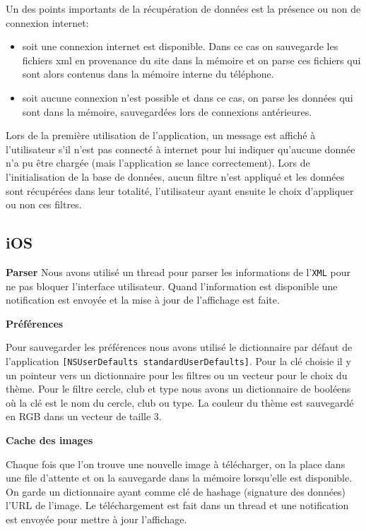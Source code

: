 \documentclass[a4paper, 11px]{article}
\begin{document}
\vspace{0.5cm}
\noindent Un des points importants de la récupération de données est la présence ou non de connexion internet: 
\begin{itemize}
\item soit une connexion internet est disponible. Dans ce cas on sauvegarde les fichiers xml en provenance du site dans la mémoire et on parse ces fichiers qui sont alors contenus dans la mémoire interne du téléphone.
\item soit aucune connexion n'est possible et dans ce cas, on parse les données qui sont dans la mémoire, sauvegardées lors de connexions antérieures.\\
\end{itemize}

\noindent Lors de la première utilisation de l'application, un message est affiché à l'utilisateur s'il n'est pas connecté à internet pour lui indiquer qu'aucune donnée n'a pu être chargée (mais l'application se lance correctement).
 Lors de l'initialisation de la base de données, aucun filtre n'est appliqué et les données sont récupérées dans leur totalité, l'utilisateur ayant ensuite le choix d'appliquer ou non ces filtres.

\subsection{iOS}
{\bf Parser}
Nous avons utilisé un thread pour parser les informations de l'\texttt{XML} pour ne pas bloquer l'interface utilisateur. Quand l'information est disponible une notification est envoyée et la mise à jour de l'affichage est faite.


{\bf Préférences}

Pour sauvegarder les préférences nous avons utilisé le dictionnaire par défaut de l'application 
\texttt{[NSUserDefaults standardUserDefaults]}. Pour la clé choisie il y un pointeur vers un dictionnaire pour les filtres ou un vecteur pour le choix du thème. Pour le filtre cercle, club et type nous avons un dictionnaire de booléens où la clé est le nom du cercle, club ou type. La couleur du thème est sauvegardé en RGB dans un vecteur de taille 3. 
 
{\bf Cache des images}

Chaque fois que l'on trouve une nouvelle image à télécharger, on la place dans une file d'attente et on la sauvegarde dans la mémoire lorsqu'elle est disponible. On garde un dictionnaire ayant comme clé de hashage (signature des données) l'URL de l'image. Le téléchargement est fait dans un thread et une notification est envoyée pour mettre à jour l'affichage.
\end{document}
